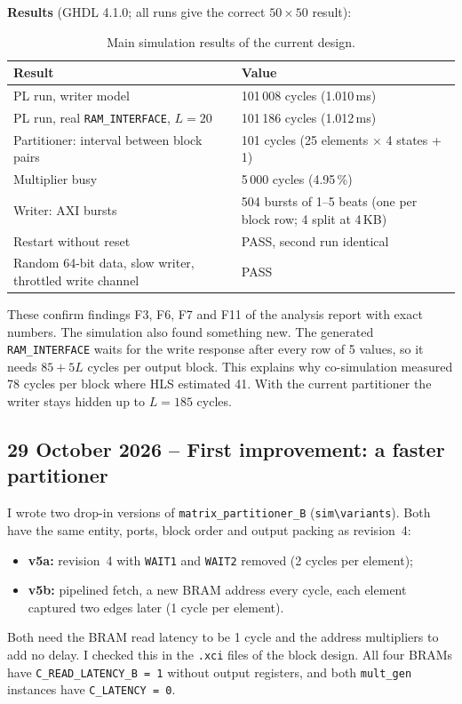 \documentclass[11pt,a4paper]{article}
\newcommand{\code}[1]{\texttt{#1}}
\begin{document}
\textbf{Results} (GHDL 4.1.0; all runs give the correct $50\times50$ result):
\begin{table}[H]
\centering
\begin{tabularx}{\textwidth}{@{}Yl@{}}
\toprule
\textbf{Result} & \textbf{Value} \\
\midrule
PL run, writer model & 101\,008 cycles (1.010\,ms) \\
PL run, real \code{RAM\_INTERFACE}, $L = 20$ & 101\,186 cycles (1.012\,ms) \\
Partitioner: interval between block pairs & 101 cycles (25 elements $\times$ 4 states + 1) \\
Multiplier busy & 5\,000 cycles (4.95\,\%) \\
Writer: AXI bursts & 504 bursts of 1--5 beats (one per block row; 4 split at 4\,KB) \\
Restart without reset & PASS, second run identical \\
Random 64-bit data, slow writer, throttled write channel & PASS \\
\bottomrule
\end{tabularx}
\caption{Main simulation results of the current design.}
\end{table}

These confirm findings F3, F6, F7 and F11 of the analysis report with exact numbers. The simulation also found something new. The generated \code{RAM\_INTERFACE} waits for the write response after every row of 5 values, so it needs $85 + 5L$ cycles per output block. This explains why co-simulation measured 78 cycles per block where HLS estimated 41. With the current partitioner the writer stays hidden up to $L = 185$ cycles.

\subsection{29 October 2026 -- First improvement: a faster partitioner}
I wrote two drop-in versions of \code{matrix\_partitioner\_B} (\code{sim\textbackslash variants}). Both have the same entity, ports, block order and output packing as revision~4:
\begin{itemize}[noitemsep]
  \item \textbf{v5a:} revision~4 with \code{WAIT1} and \code{WAIT2} removed (2 cycles per element);
  \item \textbf{v5b:} pipelined fetch, a new BRAM address every cycle, each element captured two edges later (1 cycle per element).
\end{itemize}
Both need the BRAM read latency to be 1 cycle and the address multipliers to add no delay. I checked this in the \code{.xci} files of the block design. All four BRAMs have \code{C\_READ\_LATENCY\_B = 1} without output registers, and both \code{mult\_gen} instances have \code{C\_LATENCY = 0}.
\end{document}
